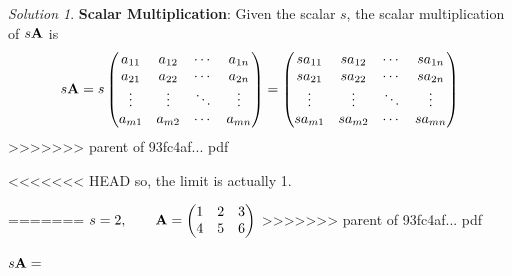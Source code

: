 \documentclass[]{book}
\theoremstyle{definition}
\theoremstyle{definition}
\theoremstyle{definition}
\theoremstyle{remark}
\newtheorem*{solution}{Solution}
\begin{document}
\begin{solution}
\textbf{Scalar Multiplication}: Given the scalar \(s\), the scalar multiplication of \(s {\bf A}\) is
\[ s {\bf A}=  s \begin{pmatrix}
            a_{11} & a_{12} & \cdots & a_{1n} \\
            a_{21} & a_{22} & \cdots & a_{2n} \\
            \vdots & \vdots & \ddots & \vdots \\
            a_{m1} & a_{m2} & \cdots & a_{mn}
        \end{pmatrix}
        = \begin{pmatrix}
            s a_{11} & s a_{12} & \cdots & s a_{1n} \\
            s a_{21} & s a_{22} & \cdots & s a_{2n} \\
            \vdots & \vdots & \ddots & \vdots \\
            s a_{m1} & s a_{m2} & \cdots & s a_{mn}
        \end{pmatrix}\]
>>>>>>> parent of 93fc4af... pdf

\protect\hypertarget{exm:scalarmulti}{}{\label{exm:scalarmulti} }

<<<<<<< HEAD
so, the limit is actually 1.
\end{solution}
=======
\(s=2, \qquad {\bf A}=\begin{pmatrix} 1 & 2 & 3 \\ 4 & 5 & 6 \end{pmatrix}\)
>>>>>>> parent of 93fc4af... pdf

\(s {\bf A} =\)
\end{document}
